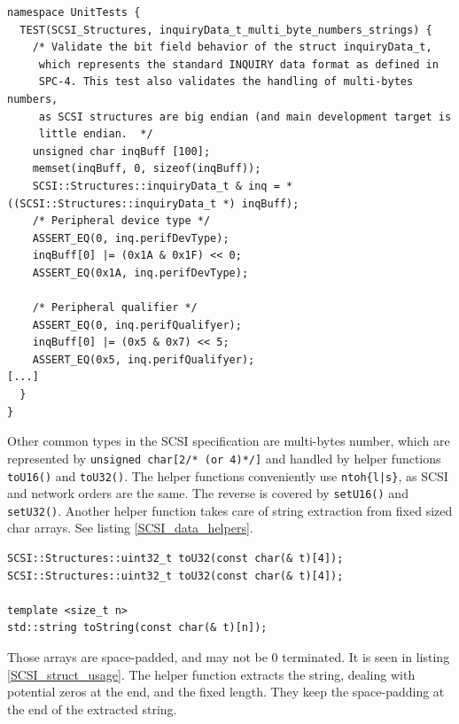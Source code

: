 \begin{table}
\begin{lstlisting}[caption=SCSI::Structures usage example,label=SCSI_struct_testing]
namespace UnitTests {
  TEST(SCSI_Structures, inquiryData_t_multi_byte_numbers_strings) {
    /* Validate the bit field behavior of the struct inquiryData_t,
     which represents the standard INQUIRY data format as defined in 
     SPC-4. This test also validates the handling of multi-bytes numbers,
     as SCSI structures are big endian (and main development target is 
     little endian.  */
    unsigned char inqBuff [100];
    memset(inqBuff, 0, sizeof(inqBuff));
    SCSI::Structures::inquiryData_t & inq = *((SCSI::Structures::inquiryData_t *) inqBuff);
    /* Peripheral device type */
    ASSERT_EQ(0, inq.perifDevType);
    inqBuff[0] |= (0x1A & 0x1F) << 0;
    ASSERT_EQ(0x1A, inq.perifDevType);
    
    /* Peripheral qualifier */
    ASSERT_EQ(0, inq.perifQualifyer);
    inqBuff[0] |= (0x5 & 0x7) << 5;
    ASSERT_EQ(0x5, inq.perifQualifyer);
[...]
  }
}
\end{lstlisting}
\end{table}

Other common types in the SCSI specification are multi-bytes
number, which are represented by \verb#unsigned char[2/* (or 4)*/]# and handled by helper functions 
\verb#toU16()# and \verb#toU32()#. The helper functions
conveniently use \verb#ntoh{l|s}#, as SCSI and network orders are the same. The reverse
is covered by \verb#setU16()# and \verb#setU32()#. Another helper function 
takes care of string extraction from fixed sized char arrays. See listing \ref{SCSI_data_helpers}.

\begin{table}
\begin{lstlisting}[caption=SCSI::Structures helper functions,label=SCSI_data_helpers]
SCSI::Structures::uint32_t toU32(const char(& t)[4]);
SCSI::Structures::uint32_t toU32(const char(& t)[4]);

template <size_t n>
std::string toString(const char(& t)[n]);
\end{lstlisting}
\end{table}

Those arrays are space-padded, and may not be 0 terminated. It is seen in listing \ref{SCSI_struct_usage}.
The helper function extracts the string, dealing with potential zeros at the end,
and the fixed length. They keep the space-padding at the end of the extracted
string.

